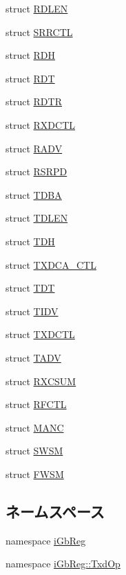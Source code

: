 \begin{DoxyCompactItemize}
struct \hyperlink{structiGbReg_1_1Regs_1_1RDLEN}{RDLEN}
\item 
struct \hyperlink{structiGbReg_1_1Regs_1_1SRRCTL}{SRRCTL}
\item 
struct \hyperlink{structiGbReg_1_1Regs_1_1RDH}{RDH}
\item 
struct \hyperlink{structiGbReg_1_1Regs_1_1RDT}{RDT}
\item 
struct \hyperlink{structiGbReg_1_1Regs_1_1RDTR}{RDTR}
\item 
struct \hyperlink{structiGbReg_1_1Regs_1_1RXDCTL}{RXDCTL}
\item 
struct \hyperlink{structiGbReg_1_1Regs_1_1RADV}{RADV}
\item 
struct \hyperlink{structiGbReg_1_1Regs_1_1RSRPD}{RSRPD}
\item 
struct \hyperlink{structiGbReg_1_1Regs_1_1TDBA}{TDBA}
\item 
struct \hyperlink{structiGbReg_1_1Regs_1_1TDLEN}{TDLEN}
\item 
struct \hyperlink{structiGbReg_1_1Regs_1_1TDH}{TDH}
\item 
struct \hyperlink{structiGbReg_1_1Regs_1_1TXDCA__CTL}{TXDCA\_\-CTL}
\item 
struct \hyperlink{structiGbReg_1_1Regs_1_1TDT}{TDT}
\item 
struct \hyperlink{structiGbReg_1_1Regs_1_1TIDV}{TIDV}
\item 
struct \hyperlink{structiGbReg_1_1Regs_1_1TXDCTL}{TXDCTL}
\item 
struct \hyperlink{structiGbReg_1_1Regs_1_1TADV}{TADV}
\item 
struct \hyperlink{structiGbReg_1_1Regs_1_1RXCSUM}{RXCSUM}
\item 
struct \hyperlink{structiGbReg_1_1Regs_1_1RFCTL}{RFCTL}
\item 
struct \hyperlink{structiGbReg_1_1Regs_1_1MANC}{MANC}
\item 
struct \hyperlink{structiGbReg_1_1Regs_1_1SWSM}{SWSM}
\item 
struct \hyperlink{structiGbReg_1_1Regs_1_1FWSM}{FWSM}
\end{DoxyCompactItemize}
\subsection*{ネームスペース}
\begin{DoxyCompactItemize}
\item 
namespace \hyperlink{namespaceiGbReg}{iGbReg}
\item 
namespace \hyperlink{namespaceiGbReg_1_1TxdOp}{iGbReg::TxdOp}
\end{DoxyCompactItemize}
